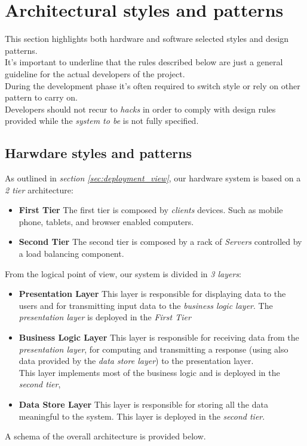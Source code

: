 \section{Architectural styles and patterns} %
\label{sec:architectural_styles_and_patterns_}
This section highlights both hardware and software selected styles and design patterns.\\
It's important to underline that the rules described below are just a general guideline for the actual developers of the project.\\
During the development phase it's often required to switch style or rely on other pattern to carry on.\\
Developers should not recur to \emph{hacks} in order to comply with design rules provided while the \emph{system to be} is not fully specified.
\subsection{Harwdare styles and patterns} %
\label{sub:harwdare_styles_and_patterns}
As outlined in \emph{section \ref{sec:deployment_view}}, our hardware system is based on a \emph{2 tier} architecture:
\begin{itemize}
	\item \textbf{First Tier} The first tier is composed by \emph{clients} devices. Such as mobile phone, tablets, and browser enabled computers.
	\item \textbf{Second Tier} The second tier is composed by a rack of \emph{Servers} controlled by a load balancing component.
\end{itemize}
From the logical point of view, our system is divided in \emph{3 layers}:
\begin{itemize}
	\item \textbf{Presentation Layer} This layer is responsible for displaying data to the users and for transmitting input data to the \emph{business logic layer}. The \emph{presentation layer} is deployed in the \emph{First Tier}
	\item \textbf{Business Logic Layer} This layer is responsible for receiving data from the \emph{presentation layer}, for computing and transmitting a response (using also data provided by the \emph{data store layer}) to the presentation layer.\\
	This layer implements most of the business logic and is deployed in the \emph{second tier},
	\item \textbf{Data Store Layer} This layer is responsible for storing all the data meaningful to the system. This layer is deployed in the \emph{second tier}.
\end{itemize}
A schema of the overall architecture is provided below.

